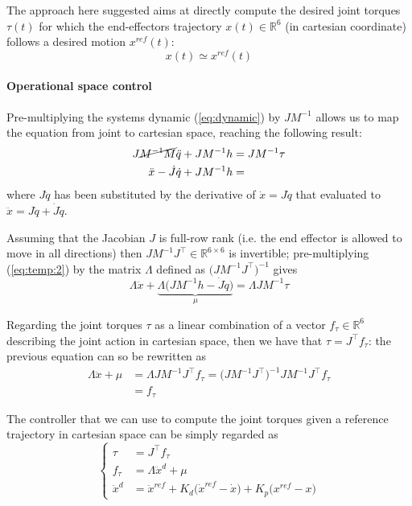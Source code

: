 	The approach here suggested aims at directly compute the desired joint torques $\tau(t)$ for which the end-effectors trajectory $x(t) \in \mathds R^6$ (in cartesian coordinate) follows a desired motion $x^{ref}(t)$:
	\[ x(t) \simeq x^{ref}(t) \]
	
	\paragraph{Operational space control} Pre-multiplying the systems dynamic (\ref{eq:dynamic}) by $JM^{-1}$ allows us to map the equation from joint to cartesian space, reaching the following result:
	\begin{equation} \label{eq:temp:2}
	\begin{split}
		J\cancel{M^{-1}M}\ddot q + JM^{-1} h & = JM^{-1} \tau \\
		\ddot x - \dot J \dot q + JM^{-1}h & =
	\end{split}
	\end{equation}
	where $J \ddot q$ has been substituted by the derivative of $\dot x = J \dot q$ that evaluated to $\ddot x = J\ddot q + \dot J \dot q$. 
	
	Assuming that the Jacobian $J$ is full-row rank (i.e. the end effector is allowed to move in all directions) then $JM^{-1}J^\top \in \mathds R^{6\times 6}$ is invertible; pre-multiplying (\ref{eq:temp:2}) by the matrix $\Lambda$ defined as $\big(JM^{-1}J^\top\big)^{-1}$ gives
	\begin{equation*}
		\Lambda \ddot x + \underbrace{\Lambda\big(JM^{-1}h - \dot J \dot q\big)}_{\mu} = \Lambda J M^{-1}\tau
	\end{equation*}
	
	Regarding the joint torques $\tau$ as a linear combination of a vector $f_\tau \in \mathds R^6$ describing the joint action in cartesian space, then we have that $\tau = J^\top f_\tau$: the previous equation can so be rewritten as
	\begin{equation} \label{eq:temp:3}
	\begin{split}
		\Lambda \ddot x + \mu & = \Lambda J M^{-1} J^\top f_\tau = \big(JM^{-1}J^\top\big)^{-1} J M^{-1} J^\top f_\tau \\ 
		& = f_\tau
	\end{split}
	\end{equation}

	The controller that we can use to compute the joint torques given a reference trajectory in cartesian space can be simply regarded as
	\begin{equation} \label{eq:cartesiancontroller}
	\begin{cases}
		\tau & = J^\top f_\tau \\
		f_\tau & = \Lambda \ddot x^d + \mu \\
		\ddot x^d & = \ddot x^{ref} + K_d\big(\dot x^{ref} - \dot x\big) + K_p\big(x^{ref} - x\big)
	\end{cases}
	\end{equation}
	

